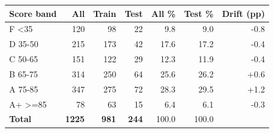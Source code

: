 \begin{tabular}{lrrrrrr}
\toprule
\textbf{Score band} & \textbf{All} & \textbf{Train} & \textbf{Test} & \textbf{All \%} & \textbf{Test \%} & \textbf{Drift (pp)} \\
\midrule
F <35 & 120 & 98 & 22 & 9.8 & 9.0 & -0.8 \\
D 35-50 & 215 & 173 & 42 & 17.6 & 17.2 & -0.4 \\
C 50-65 & 151 & 122 & 29 & 12.3 & 11.9 & -0.4 \\
B 65-75 & 314 & 250 & 64 & 25.6 & 26.2 & +0.6 \\
A 75-85 & 347 & 275 & 72 & 28.3 & 29.5 & +1.2 \\
A+ >=85 & 78 & 63 & 15 & 6.4 & 6.1 & -0.3 \\
\midrule
\textbf{Total} & \textbf{1225} & \textbf{981} & \textbf{244} & 100.0 & 100.0 & \\
\bottomrule
\end{tabular}
